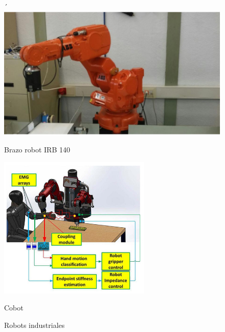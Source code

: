 \begin{figure}[ht!]
	\centering
	\begin{minipage}{0.3\linewidth}
		\centering´
		\includegraphics[width=\linewidth]{figs/brazoIRB140.png}
		\caption*{\centering Brazo robot IRB 140 \cite{villalba2017ensamblaje}}
	\end{minipage}
	\hspace{3cm}
	\begin{minipage}{0.3\linewidth}
		\centering
		\includegraphics[width=\linewidth]{figs/cobot.png}
		\caption*{\centering Cobot \cite{ELZAATARI2019162}}
	\end{minipage}
	\caption{Robots industriales}
	\label{fig:robindustriales}
\end{figure}

